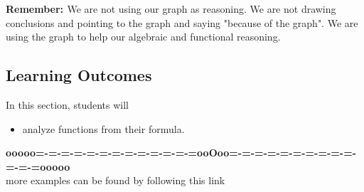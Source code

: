 \documentclass{ximera}
\begin{document}
\textbf{\textcolor{red!80!black}{Remember: }}  We are not using our graph as reasoning.  We are not drawing conclusions and pointing to the graph and saying "because of the graph".  We are using the graph to help our algebraic and functional reasoning.


\subsection{Learning Outcomes}


\begin{sectionOutcomes}
In this section, students will 

\begin{itemize}
\item analyze functions from their formula.
\end{itemize}
\end{sectionOutcomes}











\begin{center}
\textbf{\textcolor{green!50!black}{ooooo=-=-=-=-=-=-=-=-=-=-=-=-=ooOoo=-=-=-=-=-=-=-=-=-=-=-=-=ooooo}} \\

more examples can be found by following this link\\ 

\end{center}
\end{document}
